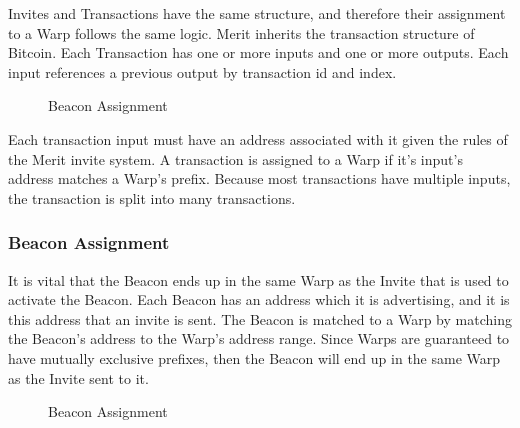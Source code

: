\documentclass{article}
\begin{document}
Invites and Transactions have the same structure, and therefore their assignment
to a Warp follows the same logic. Merit inherits the transaction structure
of Bitcoin. Each Transaction has one or more inputs and one or more outputs.
Each input references a previous output by transaction id and index.

\begin{figure}[H]
    \begin{center}
    \end{center}
    \caption{Beacon Assignment}
\end{figure}

Each transaction input must have an address associated with it given the rules
of the Merit invite system. A transaction is assigned to a Warp if it's input's
address matches a Warp's prefix. Because most transactions have multiple inputs,
the transaction is split into many transactions. 

\subsubsection{Beacon Assignment}

It is vital that the Beacon ends up in the same Warp as the Invite that is
used to activate the Beacon. Each Beacon has an address which it is advertising, and 
it is this address that an invite is sent. The Beacon is matched to a Warp
by matching the Beacon's address to the Warp's address range. Since Warps are 
guaranteed to have mutually exclusive prefixes, then the Beacon will end up 
in the same Warp as the Invite sent to it.

\begin{figure}[H]
    \begin{center}
    \end{center}
    \caption{Beacon Assignment}
\end{figure}
\end{document}
